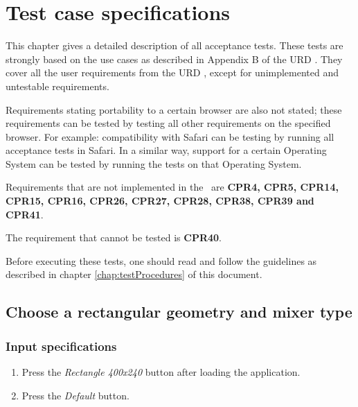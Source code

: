 \chapter{Test case specifications}
\label{chap:testCaseSpecs}
\renewcommand{\atref}[1]{AT\ref{at:#1}}

This chapter gives a detailed description of all acceptance tests. These tests are strongly based on the use cases as described in Appendix B of the URD \cite{urd}. They cover all the user requirements from the URD \cite{urd}, except for unimplemented and untestable requirements. 

Requirements stating portability to a certain browser are also not stated; these requirements can be tested by testing all other requirements on the specified browser. For example: compatibility with Safari can be testing by running all acceptance tests in Safari. In a similar way, support for a certain Operating System can be tested by running the tests on that Operating System.

Requirements that are not implemented in the \applicationname\ are \textbf{CPR4, CPR5, CPR14, CPR15, CPR16, CPR26, CPR27, CPR28, CPR38, CPR39 and CPR41}.

The requirement that cannot be tested is \textbf{CPR40}.

Before executing these tests, one should read and follow the guidelines as described in chapter \ref{chap:testProcedures} of this document.

\section{Choose a rectangular geometry and mixer type}

\subsection*{Input specifications}
\begin{enumerate}
\item Press the \emph{Rectangle 400x240} button after loading the application.
\item Press the \emph{Default} button.
\end{enumerate}

